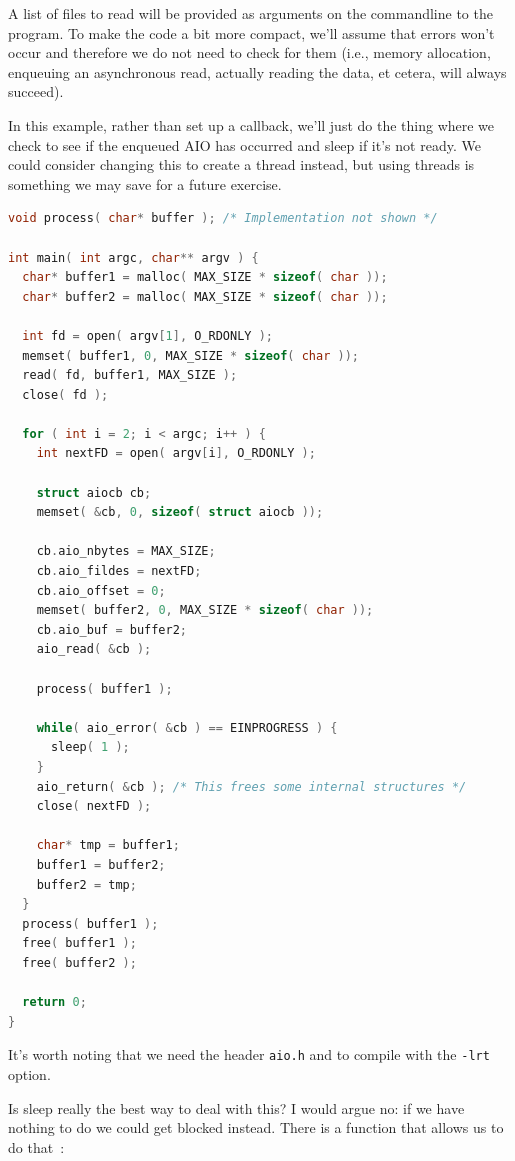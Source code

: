 \documentclass[a4paper]{report}
\begin{document}
A list of files to read will be provided as arguments on the commandline to the program. To make the code a bit more compact, we'll assume that errors won't occur and therefore we do not need to check for them (i.e., memory allocation, enqueuing an asynchronous read, actually reading the data, et cetera, will always succeed).

In this example, rather than set up a callback, we'll just do the thing where we check to see if the enqueued AIO has occurred and sleep if it's not ready. We could consider changing this to create a thread instead, but using threads is something we may save for a future exercise.

\begin{lstlisting}[language=C]
void process( char* buffer ); /* Implementation not shown */

int main( int argc, char** argv ) {
  char* buffer1 = malloc( MAX_SIZE * sizeof( char ));
  char* buffer2 = malloc( MAX_SIZE * sizeof( char ));
  
  int fd = open( argv[1], O_RDONLY );
  memset( buffer1, 0, MAX_SIZE * sizeof( char ));
  read( fd, buffer1, MAX_SIZE );
  close( fd );
  
  for ( int i = 2; i < argc; i++ ) {
    int nextFD = open( argv[i], O_RDONLY );
    
    struct aiocb cb;
    memset( &cb, 0, sizeof( struct aiocb ));
    
    cb.aio_nbytes = MAX_SIZE;
    cb.aio_fildes = nextFD;
    cb.aio_offset = 0;
    memset( buffer2, 0, MAX_SIZE * sizeof( char ));
    cb.aio_buf = buffer2;
    aio_read( &cb );
 
    process( buffer1 );
    
    while( aio_error( &cb ) == EINPROGRESS ) {
      sleep( 1 );
    }
    aio_return( &cb ); /* This frees some internal structures */
    close( nextFD );
    
    char* tmp = buffer1;
    buffer1 = buffer2;
    buffer2 = tmp;
  }
  process( buffer1 );
  free( buffer1 );
  free( buffer2 );

  return 0;
}
\end{lstlisting}

It's worth noting that we need the header \texttt{aio.h} and to compile with the \texttt{-lrt} option.

Is sleep really the best way to deal with this? I would argue no: if we have nothing to do we could get blocked instead. There is a function that allows us to do that~\cite{apunix}:
\end{document}
